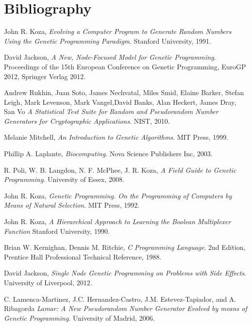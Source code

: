 \documentclass[a4paper,10.5pt]{article}
\begin{document}
\section{Bibliography}
\begin{thebibliography}{13}

  John R. Koza, 
  \emph{Evolving a Computer Program to Generate Random Numbers Using the Genetic Programming Paradigm}. 
  Stanford University, 
  1991.

David Jackson,
  \emph{A New, Node-Focused Model for Genetic Programming}.
  Proceedings of the 15th European Conference on Genetic Programming, EuroGP 2012, 
  Springer Verlag
  2012.

  Andrew Rukhin, Juan Soto, James Nechvatal, Miles Smid, Elaine Barker, Stefan Leigh, Mark Levenson, Mark Vangel,David Banks, Alan Heckert, James Dray, San Vo 
  \emph{A Statistical Test Suite for Random and Pseudorandom Number Generators for Cryptographic Applications}. 
  NIST,
  2010.

  Melanie Mitchell,
  \emph{An Introduction to Genetic Algorithms}.
  MIT Press,
  1999.

  Phillip A. Laplante,
  \emph{Biocomputing}.
  Nova Science Publishers Inc,
  2003.

  R. Poli, W. B. Langdon, N. F. McPhee, J. R. Koza, 
  \emph{A Field Guide to Genetic Programming}. 
  University of Essex, 
  2008.

  John R. Koza, 
  \emph{Genetic Programming. On the Programming of Computers by Means of Natural Selection}. 
  MIT Press, 
  1992.

  John R. Koza,
  \emph{A Hierarchical Approach to Learning the Boolean Multiplexer Function}
  Stanford University,
  1990.

  Brian W. Kernighan, Dennis M. Ritchie, 
  \emph{C Programming Language}.
  2nd Edition, 
  Prentice Hall Professional Technical Reference, 
  1988.

    David Jackson,
  \emph{Single Node Genetic Programming on Problems with Side Effects}.
  University of Liverpool,
  2012.

  C. Lamenca-Martinez, J.C. Hernandez-Castro,
  J.M. Estevez-Tapiador, and A. Ribagorda
  \emph{Lamar: A New Pseudorandom Number Generator Evolved by means of Genetic Programming}.
  University of Madrid,
  2006.


\end{thebibliography}
\end{document}
